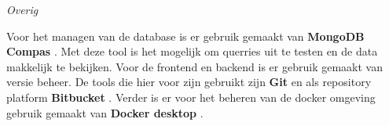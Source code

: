 \whitespace[2]
\textit{Overig}

\whitespace[2]
Voor het managen van de database is er gebruik gemaakt van \textbf{MongoDB Compas} \parencite{MongoDBCompas}.
Met deze tool is het mogelijk om querries uit te testen en de data makkelijk te bekijken.
Voor de frontend en backend is er gebruik gemaakt van versie beheer.
De tools die hier voor zijn gebruikt zijn \textbf{Git} \parencite{Git} en als repository platform \textbf{Bitbucket} \parencite{BitBucket}.
Verder is er voor het beheren van de docker omgeving gebruik gemaakt van \textbf{Docker desktop} \Parencite{DockerDesktop}.
